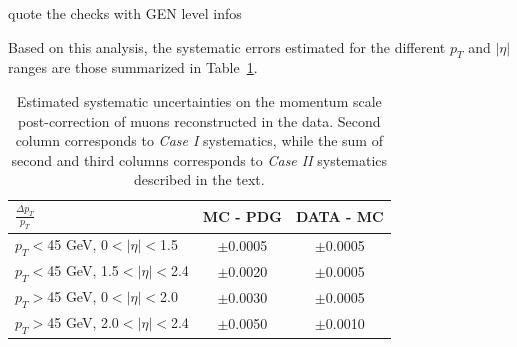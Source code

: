 \FIXME quote the checks with GEN level infos

Based on this analysis, the systematic errors estimated for the
different $p_T$ and $|\eta|$ ranges are those summarized in
Table~\ref{tab:systematics}.
\begin{table}[hbH]
\begin{center}
\caption{Estimated systematic uncertainties on the momentum scale
  post-correction of muons reconstructed in the data.
  Second column corresponds to {\sl Case I} systematics, while
  the sum of second and third columns corresponds to {\sl Case II}
  systematics described in the text.\label{tab:systematics}} 
\begin{tabular}{|l|c|c|}
\hline
$\frac{\Delta p_T}{p_T}$ & MC - PDG & DATA - MC \\
\hline 
$p_T<$45 GeV,   0$<|\eta|<$1.5 & $\pm$0.0005 & $\pm$0.0005\\
$p_T<$45 GeV, 1.5$<|\eta|<$2.4 & $\pm$0.0020 & $\pm$0.0005\\
$p_T>$45 GeV,   0$<|\eta|<$2.0 & $\pm$0.0030 & $\pm$0.0005\\
$p_T>$45 GeV, 2.0$<|\eta|<$2.4 & $\pm$0.0050 & $\pm$0.0010\\
\hline
\hline
\end{tabular}
\end{center}
\end{table}
